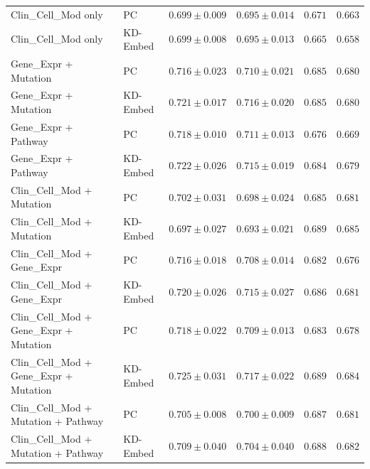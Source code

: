 \documentclass{article}
\begin{document}
\begin{table}[!ht]
{\begin{tabular}{llcccc}
Clin\_Cell\_Mod only     & PC       & $0.699 \pm 0.009$ & $0.695 \pm 0.014$ & $0.671$ & $0.663$ \\
Clin\_Cell\_Mod only     & KD-Embed & $0.699 \pm 0.008$ & $0.695 \pm 0.013$ & $0.665$ & $0.658$ \\
\midrule
Gene\_Expr + Mutation    & PC       & $0.716 \pm 0.023$ & $0.710 \pm 0.021$ & $0.685$ & $0.680$ \\
Gene\_Expr + Mutation    & KD-Embed & $0.721 \pm 0.017$ & $0.716 \pm 0.020$ & $0.685$ & $0.680$ \\
\midrule
Gene\_Expr + Pathway     & PC       & $0.718 \pm 0.010$ & $0.711 \pm 0.013$ & $0.676$ & $0.669$ \\
Gene\_Expr + Pathway     & KD-Embed & $0.722 \pm 0.026$ & $0.715 \pm 0.019$ & $0.684$ & $0.679$ \\
\midrule
Clin\_Cell\_Mod + Mutation & PC       & $0.702 \pm 0.031$ & $0.698 \pm 0.024$ & $0.685$ & $0.681$ \\
Clin\_Cell\_Mod + Mutation & KD-Embed & $0.697 \pm 0.027$ & $0.693 \pm 0.021$ & $0.689$ & $\mathbf{0.685}$ \\
\midrule
Clin\_Cell\_Mod + Gene\_Expr & PC       & $0.716 \pm 0.018$ & $0.708 \pm 0.014$ & $0.682$ & $0.676$ \\
Clin\_Cell\_Mod + Gene\_Expr & KD-Embed & $0.720 \pm 0.026$ & $0.715 \pm 0.027$ & $0.686$ & $0.681$ \\
\midrule
Clin\_Cell\_Mod + Gene\_Expr + Mutation & PC       & $0.718 \pm 0.022$ & $0.709 \pm 0.013$ & $0.683$ & $0.678$ \\
Clin\_Cell\_Mod + Gene\_Expr + Mutation & KD-Embed & $\mathbf{0.725 \pm 0.031}$ & $0.717 \pm 0.022$ & $0.689$ & $0.684$ \\
\midrule
Clin\_Cell\_Mod + Mutation + Pathway & PC       & $0.705 \pm 0.008$ & $0.700 \pm 0.009$ & $0.687$ & $0.681$ \\
Clin\_Cell\_Mod + Mutation + Pathway & KD-Embed & $0.709 \pm 0.040$ & $0.704 \pm 0.040$ & $0.688$ & $0.682$ \\
\bottomrule
\end{tabular}
}
\end{table}
\end{document}
